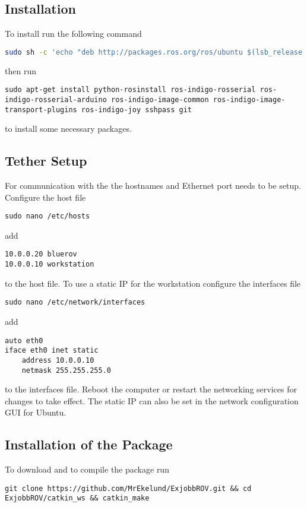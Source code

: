 \subsection{\abbrROS Installation}
To install \abbrROS run the following command
\begin{lstlisting}[language=bash]
sudo sh -c 'echo "deb http://packages.ros.org/ros/ubuntu $(lsb_release -sc) main" > /etc/apt/sources.list.d/ros-latest.list' && sudo apt-get install ros-indigo-ros-desktop-full && sudo rosdep init && rosdep update && echo "source /opt/ros/indigo/setup.bash" >> ~/.bashrc && source ~/.bashrc
\end{lstlisting}
then run 
\begin{lstlisting}
sudo apt-get install python-rosinstall ros-indigo-rosserial ros-indigo-rosserial-arduino ros-indigo-image-common ros-indigo-image-transport-plugins ros-indigo-joy sshpass git
\end{lstlisting}
to install some necessary packages.

\subsection{Tether Setup}
For communication with the \abbrROV the hostnames and Ethernet port needs to be setup.
Configure the host file 
\begin{lstlisting}
sudo nano /etc/hosts
\end{lstlisting}
add
\begin{lstlisting}
10.0.0.20 bluerov
10.0.0.10 workstation
\end{lstlisting}
to the host file. To use a static IP for the workstation configure the interfaces file
\begin{lstlisting}
sudo nano /etc/network/interfaces
\end{lstlisting}
add 
\begin{lstlisting}
auto eth0
iface eth0 inet static
    address 10.0.0.10
    netmask 255.255.255.0
\end{lstlisting}
to the interfaces file. Reboot the computer or restart the networking services for changes to take effect. The static IP can also be set in the network configuration GUI for Ubuntu.

\subsection{Installation of the \abbrROV Package}
To download and to compile the package run
\begin{lstlisting}
git clone https://github.com/MrEkelund/ExjobbROV.git && cd ExjobbROV/catkin_ws && catkin_make
\end{lstlisting}